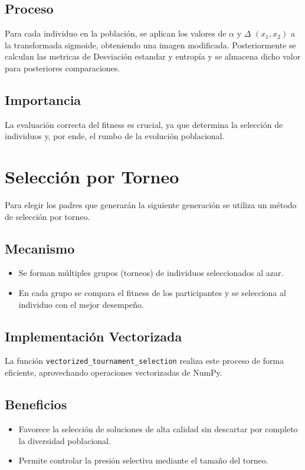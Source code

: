 \subsection*{Proceso}
Para cada individuo en la población, se aplican los valores de $\alpha$ y $\Delta$ $(x_1, x_2)$ a la transformada sigmoide, obteniendo una imagen modificada. Posteriormente se calculan las metricas de Desviaci\'on estandar y entrop\'ia  y se almacena dicho valor para posteriores comparaciones.

\subsection*{Importancia}
La evaluaci\'on correcta del fitness es crucial, ya que determina la selecci\'on de individuos y, por ende, el rumbo de la evoluci\'on poblacional.

\section{Selecci\'on por Torneo}

Para elegir los padres que generar\'an la siguiente generaci\'on se utiliza un m\'etodo de selecci\'on por torneo.

\subsection*{Mecanismo}
\begin{itemize}
    \item Se forman m\'ultiples grupos (torneos) de individuos seleccionados al azar.
    \item En cada grupo se compara el fitness de los participantes y se selecciona al individuo con el mejor desempe\~no.
\end{itemize}

\subsection*{Implementaci\'on Vectorizada}
La funci\'on \texttt{vectorized\_tournament\_selection} realiza este proceso de forma eficiente, aprovechando operaciones vectorizadas de NumPy.

\subsection*{Beneficios}
\begin{itemize}
    \item Favorece la selecci\'on de soluciones de alta calidad sin descartar por completo la diversidad poblacional.
    \item Permite controlar la presi\'on selectiva mediante el tama\~no del torneo.
\end{itemize}


